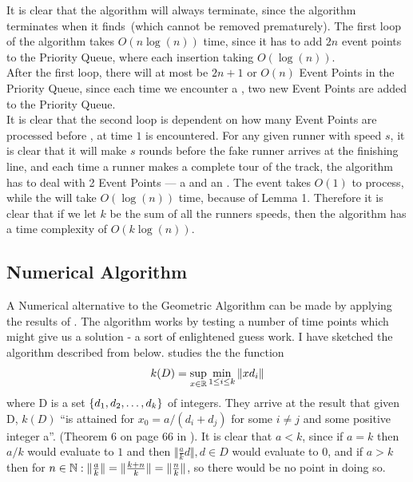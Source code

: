 {}
{
It is clear that the algorithm will always terminate, since the algorithm terminates when it finds \comFin\,(which cannot be removed prematurely).
}
{}
{
The first loop of the algorithm takes $O(n\log(n))$ time, since it has to add $2n$ event points to the Priority Queue, where each insertion taking $O(\log(n))$.\\

After the first loop, there will at most be $2n + 1$ or $O(n)$ Event Points in the Priority Queue, since each time we encounter a \comEnd, two new Event Points are added to the Priority Queue.\\ 

It is clear that the second loop is dependent on how many Event Points are processed before \comFin, at time $1$ is encountered. For any given runner with speed $s$, it is clear that it will make $s$ rounds before the fake runner arrives at the finishing line, and each time  a runner makes a complete tour of the track, the algorithm has to deal with 2 Event Points --- a \comStart\; and an \comEnd. The \comStart\; event takes $O(1)$ to process, while the \comEnd\; will take $O(\log(n))$ time, because of Lemma 1. Therefore it is clear that if we let  $k$ be the sum of all the runners speeds, then the algorithm has a time complexity of $O(k\log(n))$.
}

\subsection{Numerical Algorithm}
\label{numtheory:algo}
A Numerical alternative to the Geometric Algorithm can be made by applying the results of \cite{invis}. The algorithm works by testing a number of time points which might give us a solution - a sort of enlightened guess work. I have sketched the algorithm described from \cite{invis} below. \cite{invis} studies the the function 
$$
k(D) = \sup_{x \in \mathbb{R}}\min_{1 \leq i \leq k}\Vert x d_i \Vert
$$
where D is a set $\{d_1, d_2, \ldots, d_k\}$ of integers. They arrive at the result that given D, $k(D)$ ``is attained for $x_0 = a /(d_i + d_j)$ for some $i \neq j$ and some positive integer a''. (Theorem 6 on page 66 in \cite{invis}). It is clear that $a < k$, since if $a = k$ then $a/k$ would evaluate to $1$ and then $\Vert \frac{a}{k} d\Vert, d \in D$ would evaluate to 0, and if $a > k$ then for $n \in \mathbb{N}: \Vert\frac{a}{k}\Vert = \Vert\frac{k+n}{k}\Vert = \Vert\frac{n}{k}\Vert$, so there would be no point in doing so.

